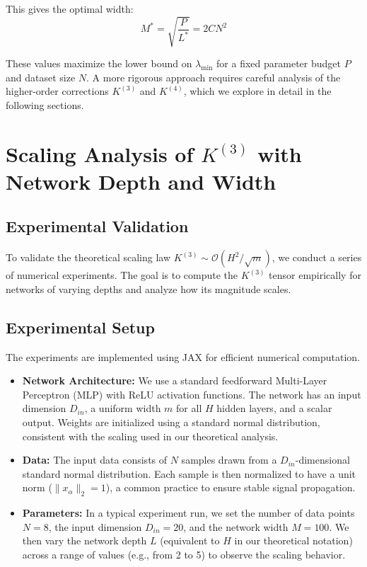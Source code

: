 \documentclass{article}
\newcommand{\Order}{\mathcal{O}}
\begin{document}
This gives the optimal width:
\[
M^* = \sqrt{\frac{P}{L^*}} = 2 C N^2
\]

These values maximize the lower bound on $\lambda_{\min}$ for a fixed parameter budget $P$ and dataset size $N$. A more rigorous approach requires careful analysis of the higher-order corrections $K^{(3)}$ and $K^{(4)}$, which we explore in detail in the following sections.


\newpage
\section{Scaling Analysis of $K^{(3)}$ with Network Depth and Width}



\subsection{Experimental Validation}

To validate the theoretical scaling law $K^{(3)} \sim \Order(H^2/\sqrt{m})$, we conduct a series of numerical experiments. The goal is to compute the $K^{(3)}$ tensor empirically for networks of varying depths and analyze how its magnitude scales.

\subsection{Experimental Setup}

The experiments are implemented using JAX for efficient numerical computation.

\begin{itemize}
    \item \textbf{Network Architecture:} We use a standard feedforward Multi-Layer Perceptron (MLP) with ReLU activation functions. The network has an input dimension $D_{in}$, a uniform width $m$ for all $H$ hidden layers, and a scalar output. Weights are initialized using a standard normal distribution, consistent with the scaling used in our theoretical analysis.

    \item \textbf{Data:} The input data consists of $N$ samples drawn from a $D_{in}$-dimensional standard normal distribution. Each sample is then normalized to have a unit norm ($\|x_\alpha\|_2 = 1$), a common practice to ensure stable signal propagation.

    \item \textbf{Parameters:} In a typical experiment run, we set the number of data points $N=8$, the input dimension $D_{in}=20$, and the network width $M=100$. We then vary the network depth $L$ (equivalent to $H$ in our theoretical notation) across a range of values (e.g., from 2 to 5) to observe the scaling behavior.
\end{itemize}
\end{document}
